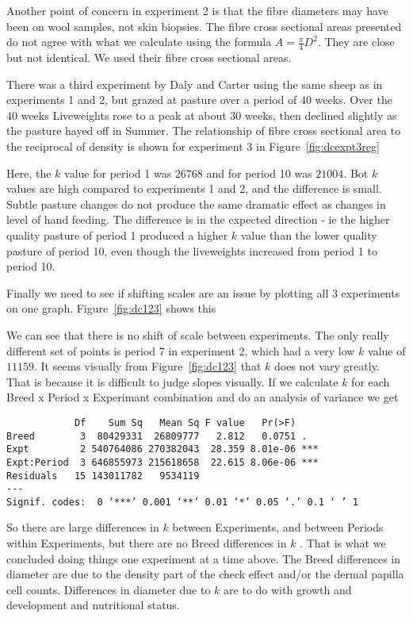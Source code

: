 \documentclass[titlepage]{article}  %
\begin{document}
Another point of concern in experiment 2 is that the fibre diameters may have been on wool samples, not skin biopsies. The fibre cross sectional areas presented do not agree with what we calculate using the formula $A = \frac{\pi}{4} D^{2}$. They are close but not identical.  We used their fibre cross sectional areas.

There was a third experiment by Daly and Carter using the same sheep as in experiments 1 and 2, but grazed at pasture over a period of 40 weeks. Over the 40 weeks Liveweights rose to a peak at about 30 weeks, then declined slightly as the pasture hayed off in Summer. The relationship of fibre cross sectional area to the reciprocal of density is shown for experiment 3 in Figure~\ref{fig:dcexpt3reg}

Here, the $k$ value for period 1 was $26768$ and for period 10 was $21004$. Bot $k$ values are high compared to experiments 1 and 2, and the difference is small. Subtle pasture changes do not produce the same dramatic effect as changes in level of hand feeding. The difference is in the expected direction - ie the higher quality pasture of period 1 produced a higher $k$ value than the lower quality pasture of period 10, even though the liveweights increased from period 1 to period 10.

Finally we need to see if shifting scales are an issue by plotting all 3 experiments on one graph. Figure~\ref{fig:dc123} shows this

We can see that there is no shift of scale between experiments. The only really different set of points is period 7 in experiment 2, which had a very low $k$ value of $11159$. It seems visually from Figure~\ref{fig:dc123} that $k$ does not vary greatly.  That is because it is difficult to judge slopes visually. If we calculate $k$ for each Breed x Period x Experimant combination and do an analysis of variance we get
\begin{verbatim}
            Df    Sum Sq   Mean Sq F value   Pr(>F)    
Breed        3  80429331  26809777   2.812   0.0751 .  
Expt         2 540764086 270382043  28.359 8.01e-06 ***
Expt:Period  3 646855973 215618658  22.615 8.06e-06 ***
Residuals   15 143011782   9534119                     
---
Signif. codes:  0 ‘***’ 0.001 ‘**’ 0.01 ‘*’ 0.05 ‘.’ 0.1 ‘ ’ 1
\end{verbatim}
So there are large differences in $k$ between Experiments, and between Periods within Experiments, but there are no Breed differences in $k$ . That is what we concluded doing things one experiment at a time above.  The Breed differences in diameter are due to the density part of the check effect and/or the dermal papilla cell counts. Differences in diameter due to $k$ are to do with growth and development and nutritional status.
\end{document}
